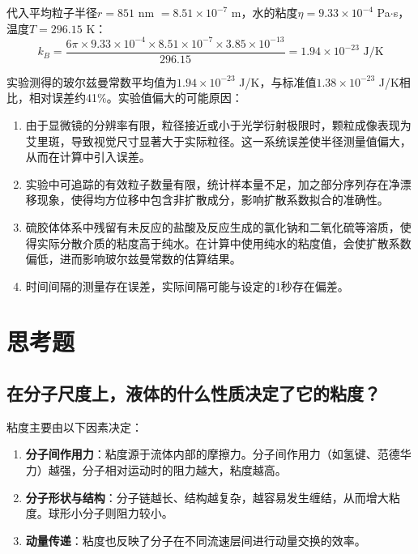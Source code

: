 \documentclass[a4paper]{article}
\begin{document}
代入平均粒子半径$r = 851$ nm $= 8.51\times10^{-7}$ m，水的粘度$\eta = 9.33\times10^{-4}$ Pa$\cdot$s，温度$T = 296.15$ K：
\begin{equation}
	k_B = \frac{6\pi \times 9.33\times10^{-4} \times 8.51\times10^{-7} \times 3.85\times10^{-13}}{296.15} = 1.94\times10^{-23} \text{ J/K}
\end{equation}

实验测得的玻尔兹曼常数平均值为$1.94\times10^{-23}$ J/K，与标准值$1.38\times10^{-23}$ J/K相比，相对误差约41\%。实验值偏大的可能原因：

\begin{enumerate}[label=(\arabic*),leftmargin=3em]
	\item 由于显微镜的分辨率有限，粒径接近或小于光学衍射极限时，颗粒成像表现为艾里斑，导致视觉尺寸显著大于实际粒径。这一系统误差使半径测量值偏大，从而在计算中引入误差。
	\item 实验中可追踪的有效粒子数量有限，统计样本量不足，加之部分序列存在净漂移现象，使得均方位移中包含非扩散成分，影响扩散系数拟合的准确性。
	\item 硫胶体体系中残留有未反应的盐酸及反应生成的氯化钠和二氧化硫等溶质，使得实际分散介质的粘度高于纯水。在计算中使用纯水的粘度值，会使扩散系数偏低，进而影响玻尔兹曼常数的估算结果。
	\item 时间间隔的测量存在误差，实际间隔可能与设定的1秒存在偏差。
\end{enumerate}

\section{思考题}
\vspace{-0.5em}

\subsection{在分子尺度上，液体的什么性质决定了它的粘度？}

粘度主要由以下因素决定：
\begin{enumerate}[label=(\arabic*),leftmargin=3em]
	\item \textbf{分子间作用力}：粘度源于流体内部的摩擦力。分子间作用力（如氢键、范德华力）越强，分子相对运动时的阻力越大，粘度越高。
	\item \textbf{分子形状与结构}：分子链越长、结构越复杂，越容易发生缠结，从而增大粘度。球形小分子则阻力较小。
	\item \textbf{动量传递}：粘度也反映了分子在不同流速层间进行动量交换的效率。
\end{enumerate}
\end{document}
